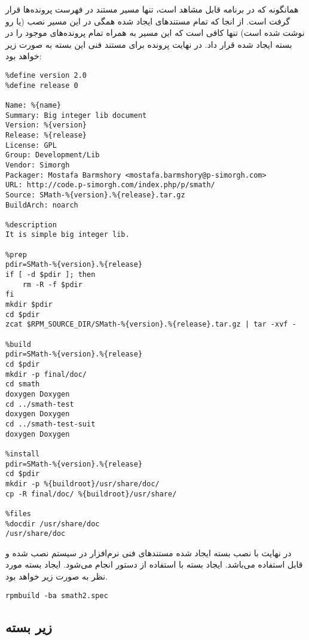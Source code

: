 همانگونه که در برنامه قابل مشاهد است، تنها مسیر مستند در فهرست پرونده‌ها
قرار گرفت است. از انجا که تمام مستندهای ایجاد شده همگی در این مسیر نصب (یا رو
نوشت شده است) تنها کافی است که این مسیر به همراه تمام پرونده‌های موجود را در
بسته ایجاد شده قرار داد. در نهایت پرونده  برای مستند فنی این بسته به
صورت زیر خواهد بود:


\begin{latin}
\lstset{language=TeX}  
\begin{lstlisting}[frame=single] 
%define name smath-doc
%define version 2.0
%define release 0

Name: %{name}
Summary: Big integer lib document
Version: %{version}
Release: %{release}
License: GPL
Group: Development/Lib
Vendor: Simorgh 
Packager: Mostafa Barmshory <mostafa.barmshory@p-simorgh.com>
URL: http://code.p-simorgh.com/index.php/p/smath/
Source: SMath-%{version}.%{release}.tar.gz
BuildArch: noarch

%description
It is simple big integer lib. 

%prep
pdir=SMath-%{version}.%{release}
if [ -d $pdir ]; then
	rm -R -f $pdir
fi
mkdir $pdir
cd $pdir
zcat $RPM_SOURCE_DIR/SMath-%{version}.%{release}.tar.gz | tar -xvf -

%build
pdir=SMath-%{version}.%{release}
cd $pdir
mkdir -p final/doc/
cd smath
doxygen Doxygen
cd ../smath-test
doxygen Doxygen
cd ../smath-test-suit
doxygen Doxygen

%install
pdir=SMath-%{version}.%{release}
cd $pdir
mkdir -p %{buildroot}/usr/share/doc/
cp -R final/doc/ %{buildroot}/usr/share/

%files
%docdir /usr/share/doc
/usr/share/doc
\end{lstlisting}
\end{latin}

در نهایت با نصب بسته ایجاد شده مستندهای فنی نرم‌افزار در سیستم نصب شده و قابل
استفاده می‌باشد. ایجاد بسته با استفاده از دستور  انجام می‌شود.
ایجاد بسته مورد نظر به صورت زیر خواهد بود.

\begin{latin}
\lstset{language=TeX}  
\begin{lstlisting}[frame=single] 
rpmbuild -ba smath2.spec
\end{lstlisting}
\end{latin}

\subsection{زیر بسته}

